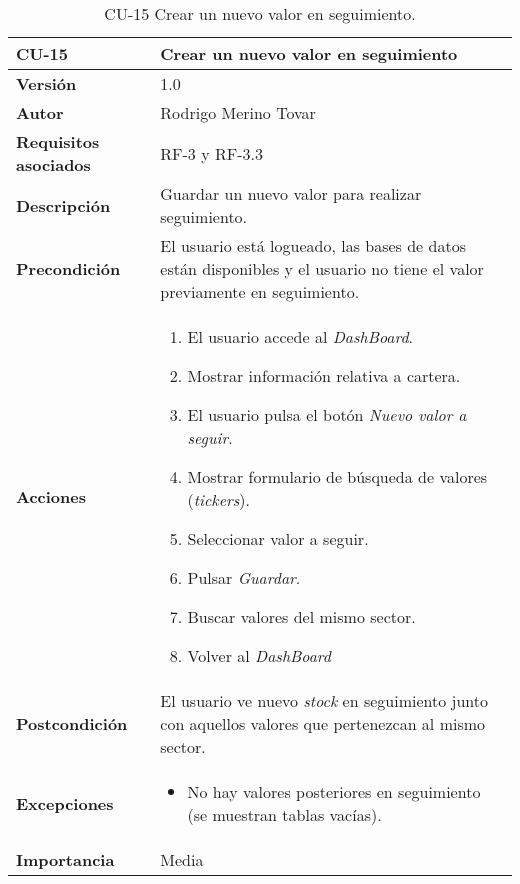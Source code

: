 \begin{table}[p]
	\centering
	\begin{tabularx}{\linewidth}{ p{} p{} }
		\toprule
		\textbf{CU-15}    & \textbf{Crear un nuevo valor en seguimiento}\\
		\toprule
		\textbf{Versión}              & 1.0    \\
		\textbf{Autor}                & Rodrigo Merino Tovar \\
		\textbf{Requisitos asociados} & RF-3 y RF-3.3 \\
		\textbf{Descripción}          & Guardar un nuevo valor para realizar seguimiento.\\
		\textbf{Precondición}         & El usuario está logueado, las bases de datos están disponibles y el usuario no tiene el valor previamente en seguimiento.  \\
		\textbf{Acciones}             &
		\begin{enumerate}
			\def\labelenumi{\arabic{enumi}.}
			\tightlist
			\item El usuario accede al \emph{DashBoard}. 
			\item Mostrar información relativa a cartera.
			\item El usuario pulsa el botón \emph{Nuevo valor a seguir}.  
			\item Mostrar formulario de búsqueda de valores (\emph{tickers}).
			\item Seleccionar valor a seguir.
			\item Pulsar \emph{Guardar}.
			\item Buscar valores del mismo sector.
			\item Volver al \emph{DashBoard}
		\end{enumerate}\\
		\textbf{Postcondición}        & El usuario ve nuevo \emph{stock} en seguimiento junto con aquellos valores que pertenezcan al mismo sector. \\
		\textbf{Excepciones}          & 
		\begin{itemize}
			\tightlist
			\item No hay valores posteriores en seguimiento (se muestran tablas vacías).
		\end{itemize} \\
		\textbf{Importancia}          & Media \\
		\bottomrule
	\end{tabularx}
	\caption{CU-15 Crear un nuevo valor en seguimiento.}
\end{table}


